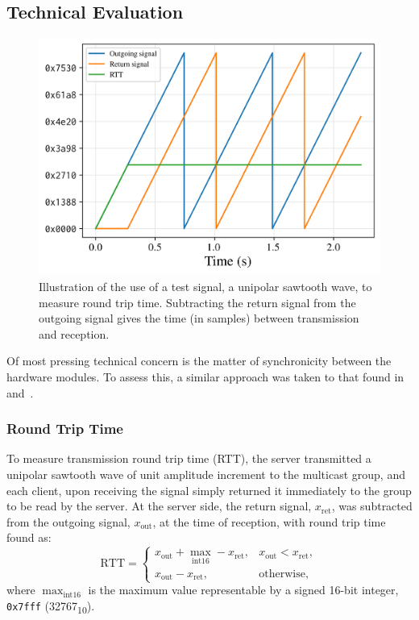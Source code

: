 \documentclass[utf8]{FrontiersinHarvard}
\newcommand{\numDec}[1]{\num{#1}\textsubscript{10}}
\begin{document}
    \subsection{Technical Evaluation}\label{subsec:technical-evaluation}

    \begin{figure}[ht]
        \centering
        \includegraphics[width=.5\textwidth]{figures/test-signal}
        \caption{
            Illustration of the use of a test signal, a unipolar sawtooth wave,
            to measure round trip time.
            Subtracting the return signal from the outgoing signal gives the time
            (in samples) between transmission and reception.
        }
        \label{fig:test-signal}
    \end{figure}
    \noindent
    Of most pressing technical concern is the matter of synchronicity between the
    hardware modules.
    To assess this, a similar approach was taken to that found
    in~\citep{rushton_microcontroller-based_2023}
    and~\citep{gabrielli_networked_2012}.

    \subsubsection{Round Trip Time}
    To measure transmission round trip time (RTT), the server transmitted a unipolar
    sawtooth wave of unit amplitude increment to the multicast group, and each
    client, upon receiving the signal simply returned it immediately to the group to
    be read by the server.
    At the server side, the return signal, $x_{\text{ret}}$, was subtracted from the
    outgoing signal, $x_{\text{out}}$, at the time of reception, with round trip
    time found as:
    \begin{equation}
        \label{eq:rtt}
        \text{RTT} = \begin{cases}
                         x_{\text{out}} + \max_{\text{int16}} - x_{\text{ret}}, &x_{\text{out}} < x_{\text{ret}}, \\
                         x_{\text{out}} - x_{\text{ret}}, &\text{otherwise},
        \end{cases}
    \end{equation}
    where $\max_{\text{int16}}$ is the maximum value representable by a
    signed 16-bit integer, \texttt{0x7fff} (\numDec{32767}).
\end{document}
